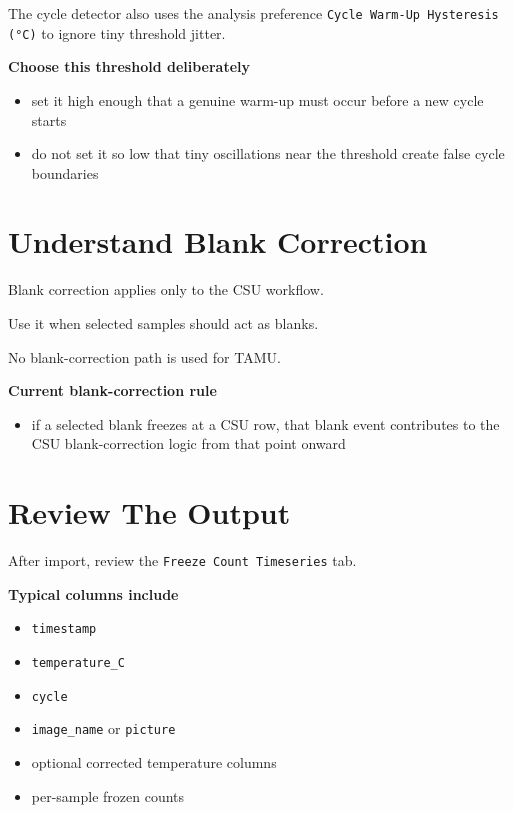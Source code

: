 \documentclass[
  9pt,
  letterpaper,
  oneside,
  open=any,
  DIV=15,
  parskip=half-,
  headings=big,
  numbers=noenddot
]{scrbook}
\newcommand{\manuallead}[1]{%
  \vspace{0.15em}%
  {\sffamily\bfseries\color{ManualBlue}#1}\par\nobreak\vspace{0.05em}%
}
\begin{document}
The cycle detector also uses the analysis preference \texttt{Cycle Warm-Up Hysteresis (°C)} to ignore tiny threshold jitter.


\manuallead{Choose this threshold deliberately}

\begin{itemize}[leftmargin=*,itemsep=0.35em,topsep=0.4em]
\item set it high enough that a genuine warm-up must occur before a new cycle starts
\item do not set it so low that tiny oscillations near the threshold create false cycle boundaries
\end{itemize}

\section{Understand Blank Correction}

Blank correction applies only to the CSU workflow.


Use it when selected samples should act as blanks.


No blank-correction path is used for TAMU.


\manuallead{Current blank-correction rule}

\begin{itemize}[leftmargin=*,itemsep=0.35em,topsep=0.4em]
\item if a selected blank freezes at a CSU row, that blank event contributes to the CSU blank-correction logic from that point onward
\end{itemize}

\section{Review The Output}

After import, review the \texttt{Freeze Count Timeseries} tab.


\manuallead{Typical columns include}

\begin{itemize}[leftmargin=*,itemsep=0.35em,topsep=0.4em]
\item \texttt{timestamp}
\item \texttt{temperature\_C}
\item \texttt{cycle}
\item \texttt{image\_name} or \texttt{picture}
\item optional corrected temperature columns
\item per-sample frozen counts
\end{itemize}
\end{document}
